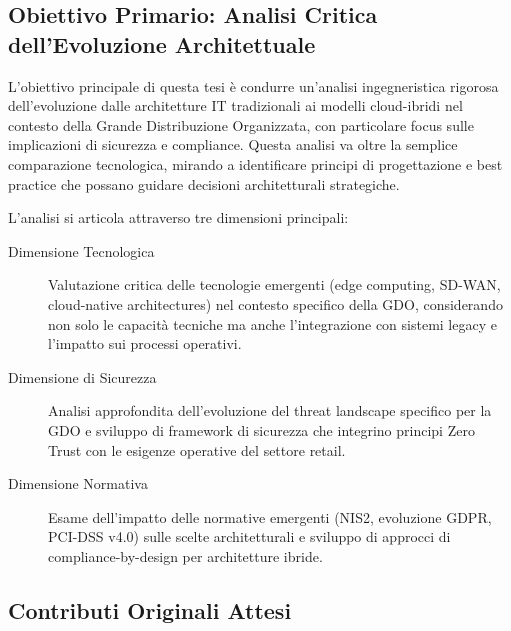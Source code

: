 \documentclass[12pt,a4paper,oneside]{book}
\begin{document}
\subsection{Obiettivo Primario: Analisi Critica dell'Evoluzione Architettuale}
\label{ssec:obiettivo_primario}

L'obiettivo principale di questa tesi è condurre un'analisi ingegneristica rigorosa dell'evoluzione dalle architetture IT tradizionali ai modelli cloud-ibridi nel contesto della Grande Distribuzione Organizzata, con particolare focus sulle implicazioni di sicurezza e compliance. Questa analisi va oltre la semplice comparazione tecnologica, mirando a identificare principi di progettazione e best practice che possano guidare decisioni architetturali strategiche.

L'analisi si articola attraverso tre dimensioni principali:
\begin{description}
    \item[Dimensione Tecnologica] Valutazione critica delle tecnologie emergenti (edge computing, SD-WAN, cloud-native architectures) nel contesto specifico della GDO, considerando non solo le capacità tecniche ma anche l'integrazione con sistemi legacy e l'impatto sui processi operativi.
    \item[Dimensione di Sicurezza] Analisi approfondita dell'evoluzione del threat landscape specifico per la GDO e sviluppo di framework di sicurezza che integrino principi Zero Trust con le esigenze operative del settore retail.
    \item[Dimensione Normativa] Esame dell'impatto delle normative emergenti (NIS2, evoluzione GDPR, PCI-DSS v4.0) sulle scelte architetturali e sviluppo di approcci di compliance-by-design per architetture ibride.
\end{description}

\subsection{Contributi Originali Attesi}
\label{ssec:contributi_originali}
\end{document}
